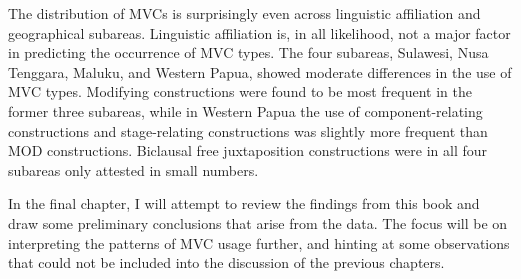 The distribution of MVCs is surprisingly even across linguistic affiliation and geographical subareas. Linguistic affiliation is, in all likelihood, not a major factor in predicting the occurrence of MVC types. The four subareas, Sulawesi, Nusa Tenggara, Maluku, and Western Papua, showed moderate differences in the use of MVC types. Modifying constructions were found to be most frequent in the former three subareas, while in Western Papua the use of component-relating constructions and stage-relating constructions was slightly more frequent than MOD constructions. Biclausal free juxtaposition constructions were in all four subareas only attested in small numbers. 

In the final chapter, I will attempt to review the findings from this book and draw some preliminary conclusions that arise from the data. The focus will be on interpreting the patterns of MVC usage further, and hinting at some observations that could not be included into the discussion of the previous chapters.
